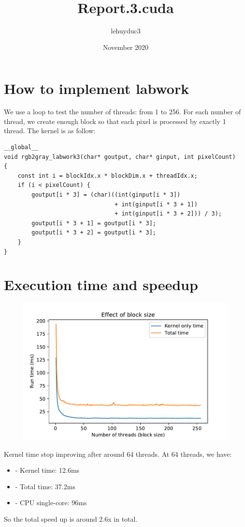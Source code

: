 \documentclass[14pt]{article}
\title{Report.3.cuda}
\author{lehuyduc3 }
\date{November 2020}
\begin{document}
\maketitle

\section{How to implement labwork}
We use a loop to test the number of threads: from 1 to 256.
For each number of thread, we create enough block so that each pixel is processed by exactly 1 thread.
The kernel is as follow:

\begin{lstlisting}
__global__
void rgb2gray_labwork3(char* goutput, char* ginput, int pixelCount)
{
	const int i = blockIdx.x * blockDim.x + threadIdx.x;
	if (i < pixelCount) {
		goutput[i * 3] = (char)((int(ginput[i * 3]) 
		                        + int(ginput[i * 3 + 1]) 
		                        + int(ginput[i * 3 + 2])) / 3);
        goutput[i * 3 + 1] = goutput[i * 3];
        goutput[i * 3 + 2] = goutput[i * 3];        
	}
}
\end{lstlisting}

\section{Execution time and speedup}

\begin{figure}[h]
\centering
\includegraphics[scale=0.75]{report3_kerneltime.pdf}
\end{figure}

Kernel time stop improving after around 64 threads. At 64 threads, we have:
\begin{itemize}
    \item - Kernel time: 12.6ms
    \item - Total time: 37.2ms
    \item - CPU single-core: 96ms
\end{itemize}

So the total speed up is around 2.6x in total.
\end{document}
